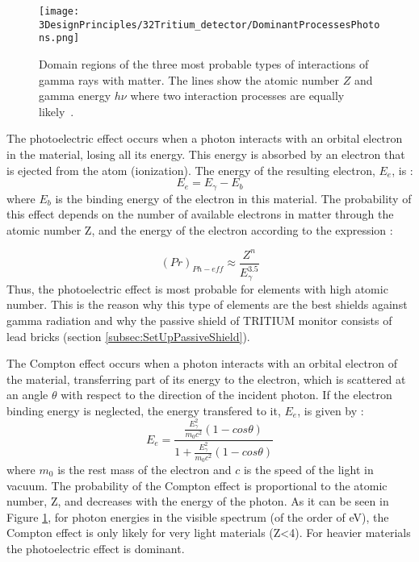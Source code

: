 \begin{figure}[h]
\centering
\texttt{[image: 3DesignPrinciples/32Tritium\_detector/DominantProcessesPhotons.png]}
\caption{Domain regions of the three most probable types of interactions of gamma rays with matter. The lines show the atomic number $Z$ and gamma energy $h\nu$ where two interaction processes are equally likely\label{fig:ProcessesPhotons}~\cite{Knoll}.}
\end{figure}

The photoelectric effect occurs when a photon interacts with an orbital electron in the material, losing all its energy. This energy is absorbed by an electron that is ejected from the atom (ionization). The energy of the resulting electron, $E_e$, is \cite{Knoll, Leo}:
\begin{equation}
E_e = E_\gamma - E_b 
\label{eq:PhotoelectricEffect}
\end{equation}
where $E_b$ is the binding energy of the electron in this material. The probability of this effect depends on the number of available electrons in matter through the atomic number Z, and the energy of the electron according to the expression \cite{Knoll}:

\begin{equation}
\left(Pr\right)_{Ph-eff} \approx \frac{Z^n}{E_\gamma^{3.5}}
\label{eq:PhotoelectricProb}
\end{equation}
Thus, the photoelectric effect is most probable for elements with high atomic number. This is the reason why this type of elements are the best shields against gamma radiation and why the passive shield of TRITIUM monitor consists of lead bricks (section \ref{subsec:SetUpPassiveShield}). %

The Compton effect occurs when a photon interacts with an orbital electron of the material, transferring part of its energy to the electron, which is scattered at an angle $\theta$ with respect to the direction of the incident photon. If the electron binding energy is neglected, the energy transfered to it, $E_e$, is given by \cite{Knoll, Leo}:
\begin{equation}
E_e=\frac{\displaystyle{\frac{E_\gamma^2}{m_0c^2}}\left(1-cos\theta\right)}{1+ \displaystyle{\frac{E_\gamma^2}{m_0c^2}}\left(1-cos\theta\right)}
\label{eq:ComptonEffect}
\end{equation}
where $m_0$ is the rest mass of the electron and $c$ is the speed of the light in vacuum. The probability of the Compton effect is proportional to the atomic number, Z,  and decreases with the energy of the photon. As it can be seen in Figure \ref{fig:ProcessesPhotons}, for photon energies in the visible spectrum (of the order of eV), the Compton effect is only likely for very light materials (Z<4). For heavier materials the photoelectric effect is dominant.

